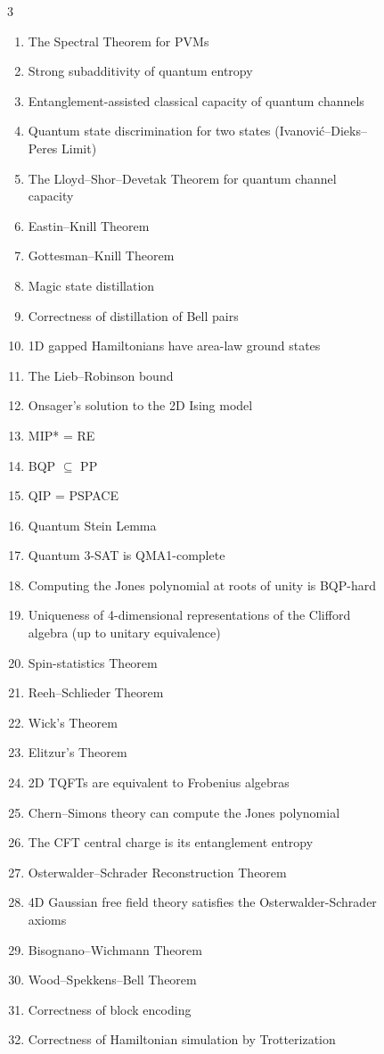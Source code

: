 \begin{figure}
\begin{multicols}{3}
{\begin{enumerate}
\item The Spectral Theorem for PVMs
\item Strong subadditivity of quantum entropy
\item Entanglement-assisted classical capacity of quantum channels
\item Quantum state discrimination for two states (Ivanović–Dieks–Peres Limit)
\item The Lloyd–Shor–Devetak Theorem for quantum channel capacity
\item Eastin–Knill Theorem
\item Gottesman–Knill Theorem
\item Magic state distillation
\item Correctness of distillation of Bell pairs
\item 1D gapped Hamiltonians have area-law ground states
\item The Lieb–Robinson bound
\item Onsager’s solution to the 2D Ising model
\item MIP* = RE
\item BQP $\subseteq$ PP
\item QIP = PSPACE
\item Quantum Stein Lemma
\item Quantum 3-SAT is QMA1-complete
\item Computing the Jones polynomial at roots of unity is BQP-hard
\item Uniqueness of 4-dimensional representations of the Clifford algebra (up to unitary equivalence)
\item Spin-statistics Theorem
\item Reeh–Schlieder Theorem
\item Wick’s Theorem
\item Elitzur’s Theorem
\item 2D TQFTs are equivalent to Frobenius algebras
\item Chern–Simons theory can compute the Jones polynomial
\item The CFT central charge is its entanglement entropy
\item Osterwalder–Schrader Reconstruction Theorem
\item 4D Gaussian free field theory satisfies the Osterwalder-Schrader axioms
\item Bisognano–Wichmann Theorem
\item Wood–Spekkens–Bell Theorem
\item Correctness of block encoding
\item Correctness of Hamiltonian simulation by Trotterization

\end{enumerate}}
\end{multicols}
\end{figure}
